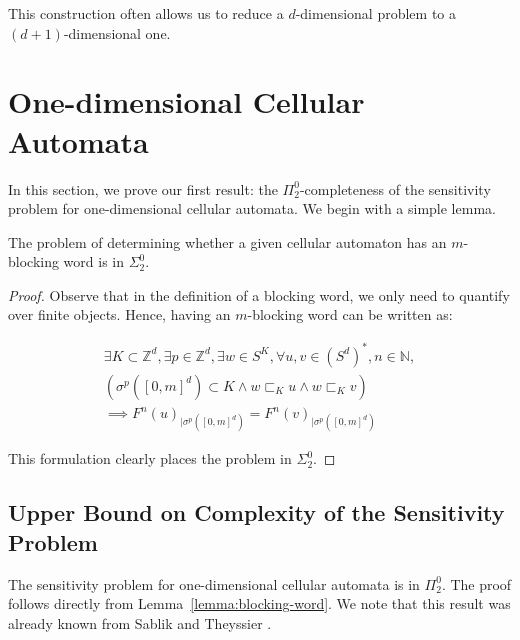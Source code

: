 \documentclass{llncs}
\begin{document}
This construction often allows us to reduce a $d$-dimensional problem to a $(d+1)$-dimensional one.  





\section{One-dimensional Cellular Automata}\label{sec:proof1}

In this section, we prove our first result: the $\Pi^0_2$-completeness of the sensitivity problem for one-dimensional cellular automata. We begin with a simple lemma.

\begin{lemma}\label{lemma:blocking-word}
The problem of determining whether a given cellular automaton has an $m$-blocking word is in $\Sigma^0_2$.
\end{lemma}

\begin{proof}
Observe that in the definition of a blocking word, we only need to quantify over finite objects. Hence, having an $m$-blocking word can be written as:

\begin{equation}
\begin{split}
    \exists K \subset \mathbb{Z}^d, \exists p \in \mathbb{Z}^d, \exists w \in S^{K}, 
    \forall u, v \in (S^d)^*, n \in \mathbb{N}, \\
    (\sigma^p([0, m]^d) \subset K \land w \sqsubset_K u \land w \sqsubset_K v) \\
    \implies F^n(u)_{|\sigma^p([0, m]^d)} = F^n(v)_{|\sigma^p([0, m]^d)}
\end{split}
\end{equation}

This formulation clearly places the problem in $\Sigma^0_2$.
\end{proof}

\subsection{Upper Bound on Complexity of the Sensitivity Problem}

The sensitivity problem for one-dimensional cellular automata is in $\Pi^0_2$. The proof follows directly from Lemma~\ref{lemma:blocking-word}. We note that this result was already known from Sablik and Theyssier \cite{sablik2011topological}.
\end{document}
